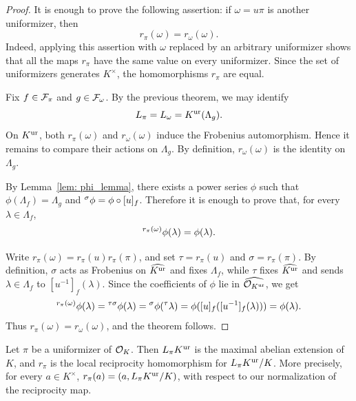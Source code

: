 \begin{proof}
    It is enough to prove the following assertion: if $\omega=u\pi$ is another
    uniformizer, then
    \[
        r_\pi(\omega)=r_\omega(\omega).
    \]
    Indeed, applying this assertion with $\omega$ replaced by an arbitrary
    uniformizer shows that all the maps $r_\pi$ have the same value on every
    uniformizer. Since the set of uniformizers generates $K^\times$, the
    homomorphisms $r_\pi$ are equal.

    Fix $f\in \mathcal{F}_\pi$ and $g\in \mathcal{F}_\omega$. By the previous theorem,
    we may identify
    \[
        L_\pi=L_\omega=K^{\mathrm{ur}}(\Lambda_g).
    \]
    On $K^{\mathrm{ur}}$, both $r_\pi(\omega)$ and $r_\omega(\omega)$ induce the
    Frobenius automorphism. Hence it remains to compare their actions on
    $\Lambda_g$. By definition, $r_\omega(\omega)$ is the identity on
    $\Lambda_g$.

    By Lemma~\ref{lem: phi_lemma}, there exists a power series $\phi$ such
    that $\phi(\Lambda_f)=\Lambda_g$ and
    ${}^{\sigma}\phi=\phi\circ [u]_f$. Therefore it is enough to prove
    that, for every $\lambda\in \Lambda_f$,
    \[
        {}^{r_\pi(\omega)}\phi(\lambda)
        =
        \phi(\lambda).
    \]

    Write $r_\pi(\omega)=r_\pi(u)r_\pi(\pi)$, and set
    $\tau=r_\pi(u)$ and $\sigma=r_\pi(\pi)$. By definition, $\sigma$ acts as
    Frobenius on $\widehat{K^{\mathrm{ur}}}$ and fixes $\Lambda_f$, while $\tau$ fixes
    $\widehat{K^{\mathrm{ur}}}$ and sends $\lambda\in\Lambda_f$ to
    $[u^{-1}]_f(\lambda)$. Since the coefficients of $\phi$ lie in
    $\widehat{\mathcal{O}_{K^{\mathrm{ur}}}}$, we get
    \[
        {}^{r_\pi(\omega)}\phi(\lambda)
        =
        {}^{\tau\sigma}\phi(\lambda)
        =
        {}^{\sigma}\phi({}^{\tau}\lambda)
        =
        \phi([u]_f([u^{-1}]_f(\lambda)))
        =
        \phi(\lambda).
    \]
    Thus $r_\pi(\omega)=r_\omega(\omega)$, and the theorem follows.
\end{proof}


\begin{corollary}
    Let $\pi$ be a uniformizer of $\mathcal{O}_K$. Then $L_\pi K^{\mathrm{ur}}$ is the maximal
    abelian extension of $K$, and $r_\pi$ is the local reciprocity homomorphism
    for $L_\pi K^{\mathrm{ur}}/K$. More precisely, for every $a\in K^\times$,
    $r_\pi(a)=(a,L_\pi K^{\mathrm{ur}}/K)$, with respect to our normalization of the
    reciprocity map.
\end{corollary}

